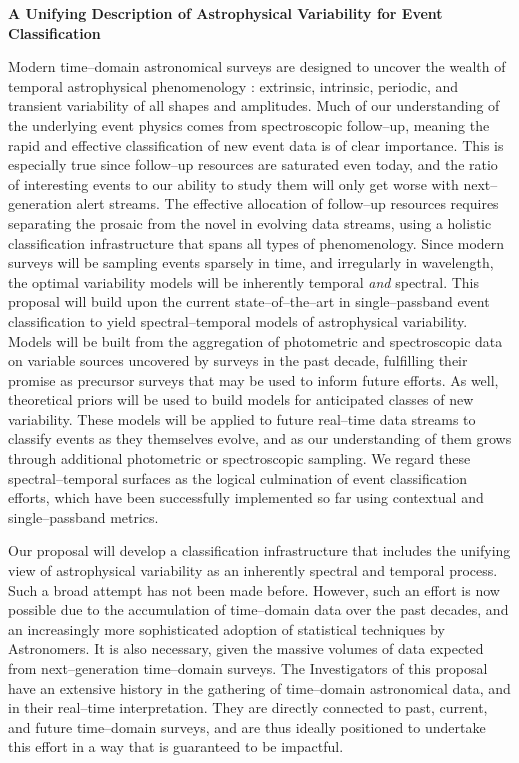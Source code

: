 \centerline{\bf A Unifying Description of Astrophysical Variability for Event
Classification} \medskip

Modern time--domain astronomical surveys are designed to uncover the wealth of
temporal astrophysical phenomenology : extrinsic, intrinsic, periodic, and
transient variability of all shapes and amplitudes.  Much of our understanding
of the underlying event physics comes from spectroscopic follow--up, meaning the
rapid and effective classification of new event data is of clear importance. 
This is especially true since follow--up resources are saturated even today, and
the ratio of interesting events to our ability to study them will only get worse
with next--generation alert streams. The effective allocation of follow--up
resources requires separating the prosaic from the novel in evolving data
streams, using a holistic classification infrastructure that spans all types of
phenomenology. Since modern surveys will be sampling events sparsely in time,
and irregularly in wavelength, the optimal variability models will be inherently
temporal {\it and} spectral.  This proposal will build upon the current
state--of--the--art in single--passband event classification to yield
spectral--temporal models of astrophysical variability.  Models will be built
from the aggregation of photometric and spectroscopic data on variable sources
uncovered by surveys in the past decade, fulfilling their promise as precursor
surveys that may be used to inform future efforts.  As well, theoretical priors
will be used to build models for anticipated classes of new variability.  These
models will be applied to future real--time data streams to classify events as
they themselves evolve, and as our understanding of them grows through
additional photometric or spectroscopic sampling.  We regard these
spectral--temporal surfaces as the logical culmination of event classification
efforts, which have been successfully implemented so far using contextual and
single--passband metrics.

\bigskip \centerline{}

Our proposal will develop a classification infrastructure that includes the
unifying view of astrophysical variability as an inherently spectral and
temporal process.  Such a broad attempt has not been made before. However, such
an effort is now possible due to the accumulation of time--domain data over the
past decades, and an increasingly more sophisticated adoption of statistical
techniques by Astronomers. It is also necessary, given the massive volumes of
data expected from next--generation time--domain surveys. The Investigators of
this proposal have an extensive history in the gathering of time--domain
astronomical data, and in their real--time interpretation.  They are directly
connected to past, current, and future time--domain surveys, and are thus
ideally positioned to undertake this effort in a way that is guaranteed to be
impactful.

